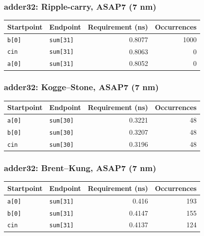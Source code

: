 \documentclass[10pt,letterpaper]{article}
\begin{document}
\subsubsection{adder32: Ripple-carry, ASAP7 (7 nm)}

\begin{tabularx}{\linewidth}{XXrr}\toprule Startpoint & Endpoint & Requirement (ns) & Occurrences \\ \midrule

\nolinkurl{b[0]} & \nolinkurl{sum[31]} & 0.8077 & 1000 \\

\nolinkurl{cin} & \nolinkurl{sum[31]} & 0.8063 & 0 \\

\nolinkurl{a[0]} & \nolinkurl{sum[31]} & 0.8052 & 0 \\

\bottomrule\end{tabularx}

\subsubsection{adder32: Kogge--Stone, ASAP7 (7 nm)}

\begin{tabularx}{\linewidth}{XXrr}\toprule Startpoint & Endpoint & Requirement (ns) & Occurrences \\ \midrule

\nolinkurl{a[0]} & \nolinkurl{sum[30]} & 0.3221 & 48 \\

\nolinkurl{b[0]} & \nolinkurl{sum[30]} & 0.3207 & 48 \\

\nolinkurl{cin} & \nolinkurl{sum[30]} & 0.3196 & 48 \\

\bottomrule\end{tabularx}

\subsubsection{adder32: Brent--Kung, ASAP7 (7 nm)}

\begin{tabularx}{\linewidth}{XXrr}\toprule Startpoint & Endpoint & Requirement (ns) & Occurrences \\ \midrule

\nolinkurl{a[0]} & \nolinkurl{sum[31]} & 0.416 & 193 \\

\nolinkurl{b[0]} & \nolinkurl{sum[31]} & 0.4147 & 155 \\

\nolinkurl{cin} & \nolinkurl{sum[31]} & 0.4137 & 124 \\

\bottomrule\end{tabularx}
\end{document}
